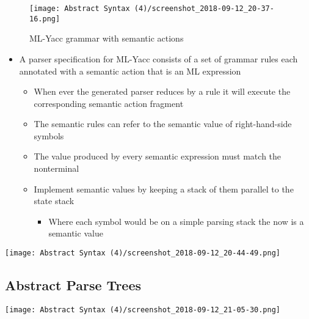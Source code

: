 \documentclass[11pt]{article}
\begin{document}
\begin{figure}[htbp]
\centering
\texttt{[image: Abstract Syntax (4)/screenshot\_2018-09-12\_20-37-16.png]}
\caption{\label{fig:org0276bc0}
ML-Yacc grammar with semantic actions}
\end{figure}

\begin{itemize}
\item A parser specification for ML-Yacc consists of a set of grammar rules each annotated with a semantic action that is an ML expression
\begin{itemize}
\item When ever the generated parser reduces by a rule it will execute the corresponding semantic action fragment
\item The semantic rules can refer to the semantic value of right-hand-side symbols
\item The value produced by every semantic expression must match the nonterminal
\item Implement semantic values by keeping a stack of them parallel to the state stack
\begin{itemize}
\item Where each symbol would be on a simple parsing stack the now is a semantic value
\end{itemize}
\end{itemize}
\end{itemize}

\begin{center}
\texttt{[image: Abstract Syntax (4)/screenshot\_2018-09-12\_20-44-49.png]}
\end{center}

\subsection{Abstract Parse Trees}
\label{sec:org59e4924}
\begin{center}
\texttt{[image: Abstract Syntax (4)/screenshot\_2018-09-12\_21-05-30.png]}
\end{center}
\end{document}
